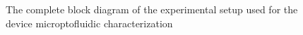 \begin{figure}[t]
\begin{adjustbox}{width=\columnwidth}
\begin{tikzpicture}







\end{tikzpicture}
 \end{adjustbox}
\caption{The complete block diagram of the experimental setup used for the device microptofluidic characterization }
\label{fig:block-diagram}
\end{figure}
